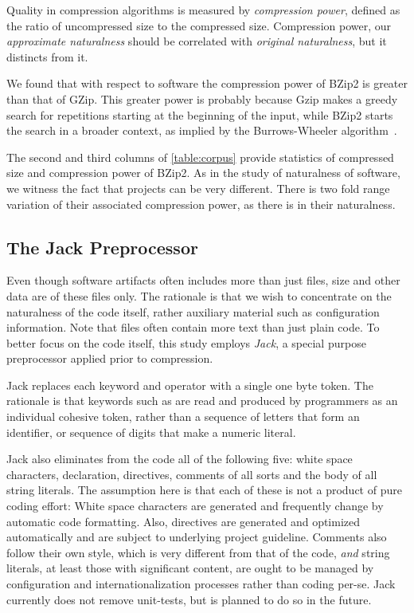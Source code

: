 Quality in compression algorithms is measured by \emph{compression power},
defined as the ratio of uncompressed size to the compressed size. Compression
power, our \emph{approximate naturalness} should be correlated with
\emph{original naturalness}, but it distincts from it.

We found that with respect to \Java software the compression power of
BZip2 is greater than that of GZip. This greater power
is probably because Gzip makes a greedy search for repetitions starting at the
beginning of the input, while BZip2 starts the search in a broader context, as
implied by the Burrows-Wheeler algorithm~\cite{Burrows:Wheeler:94}.

The second and third columns of \cref{table:corpus} provide statistics of
compressed size and compression power of BZip2. As in
the study of naturalness of software, we witness the fact that projects can be
very different. There is two fold range variation of their associated
compression power, as there is in their naturalness.

\subsection{The Jack Preprocessor}

Even though software artifacts often includes more than just  files,
size and other data are of these files only. The rationale is that we wish to
concentrate on the naturalness of the \Java code itself, rather auxiliary
material such as configuration information.
Note that  files often contain more text than just plain code. To
better focus on the code itself, this study employs \emph{Jack}, a special
purpose \Java preprocessor applied prior to compression.

Jack replaces each keyword and operator with a single one byte token. The
rationale is that keywords such as  are read and produced by
programmers as an individual cohesive token, rather than a sequence of letters
that form an identifier, or sequence of digits that make a numeric literal.

Jack also eliminates from the \Java code all of the following five: white space
characters,  declaration,  directives, comments of all
sorts and the body of all string literals. The assumption here is that each
of these is not a product of pure coding effort: White space characters are
generated and frequently change by automatic code formatting. Also, 
directives are generated and optimized automatically and are subject to
underlying project guideline. Comments also follow their own style, which is
very different from that of the code, \emph{and} string literals, at least
those with significant content, are ought to be managed by configuration and
internationalization processes rather than coding per-se.
Jack currently does not remove unit-tests, but is planned to do so in the
future.

